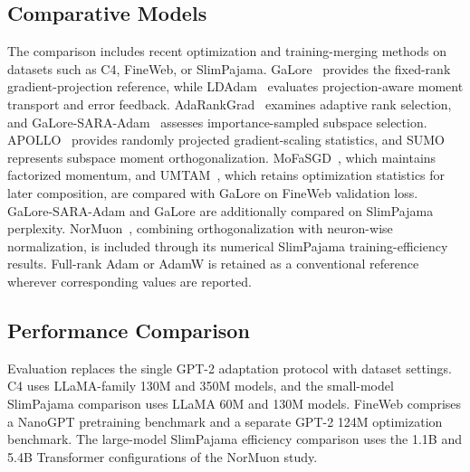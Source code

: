 \documentclass[fleqn,10pt]{wlscirep}
\begin{document}
\subsection{Comparative Models}
\label{subsec:comparative_models}
The comparison includes recent optimization and training-merging methods on datasets such as C4, FineWeb, or SlimPajama. GaLore~\cite{galore2024} provides the fixed-rank gradient-projection reference, while LDAdam~\cite{ldadam2025} evaluates projection-aware moment transport and error feedback. AdaRankGrad~\cite{adarankgrad2025} examines adaptive rank selection, and GaLore-SARA-Adam~\cite{sara2025} assesses importance-sampled subspace selection. APOLLO~\cite{apollo2025} provides randomly projected gradient-scaling statistics, and SUMO~\cite{sumo2025} represents subspace moment orthogonalization. MoFaSGD~\cite{mofasgd2025}, which maintains factorized momentum, and UMTAM~\cite{umtam2026}, which retains optimization statistics for later composition, are compared with GaLore on FineWeb validation loss. GaLore-SARA-Adam and GaLore are additionally compared on SlimPajama perplexity. NorMuon~\cite{normuon2026}, combining orthogonalization with neuron-wise normalization, is included through its numerical SlimPajama training-efficiency results. Full-rank Adam or AdamW is retained as a conventional reference wherever corresponding values are reported.











\subsection{Performance Comparison}
\label{subsec:performance_c4}
Evaluation replaces the single GPT-2 adaptation protocol with dataset settings. C4 uses LLaMA-family 130M and 350M models, and the small-model SlimPajama comparison uses LLaMA 60M and 130M models. FineWeb comprises a NanoGPT pretraining benchmark and a separate GPT-2 124M optimization benchmark. The large-model SlimPajama efficiency comparison uses the 1.1B and 5.4B Transformer configurations of the NorMuon study.
\end{document}

